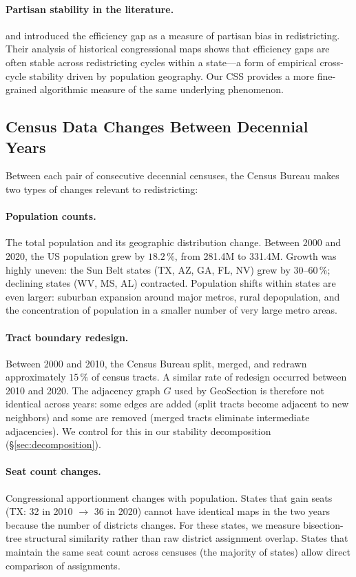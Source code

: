 \paragraph{Partisan stability in the literature.}
\citet{mcghee2014} and \citet{stephanopoulos2015} introduced the efficiency
gap as a measure of partisan bias in redistricting.
Their analysis of historical congressional maps shows that efficiency gaps are
often stable across redistricting cycles within a state---a form of empirical
cross-cycle stability driven by population geography.
Our CSS provides a more fine-grained algorithmic measure of the same
underlying phenomenon.

\subsection{Census Data Changes Between Decennial Years}

Between each pair of consecutive decennial censuses, the Census Bureau makes
two types of changes relevant to redistricting:

\paragraph{Population counts.}
The total population and its geographic distribution change.
Between 2000 and 2020, the US population grew by $18.2\,\%$, from 281.4M to
331.4M.
Growth was highly uneven: the Sun Belt states (TX, AZ, GA, FL, NV) grew by
$30$--$60\,\%$; declining states (WV, MS, AL) contracted.
Population shifts within states are even larger: suburban expansion around major
metros, rural depopulation, and the concentration of population in a smaller
number of very large metro areas.

\paragraph{Tract boundary redesign.}
Between 2000 and 2010, the Census Bureau split, merged, and redrawn
approximately $15\,\%$ of census tracts.
A similar rate of redesign occurred between 2010 and 2020.
The adjacency graph $G$ used by GeoSection is therefore not identical across
years: some edges are added (split tracts become adjacent to new neighbors) and
some are removed (merged tracts eliminate intermediate adjacencies).
We control for this in our stability decomposition (\S\ref{sec:decomposition}).

\paragraph{Seat count changes.}
Congressional apportionment changes with population.
States that gain seats (TX: 32 in 2010 $\to$ 36 in 2020) cannot have
identical maps in the two years because the number of districts changes.
For these states, we measure bisection-tree structural similarity rather
than raw district assignment overlap.
States that maintain the same seat count across censuses (the majority of
states) allow direct comparison of assignments.

